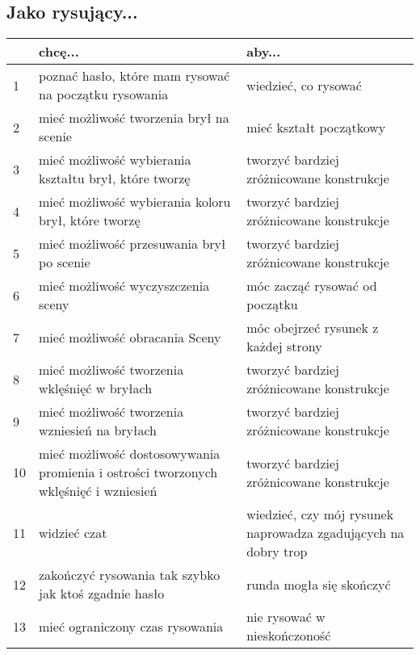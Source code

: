 \subsection{Jako rysujący...}
\begin{center}
    \begin{tabular}{ | l | p{6cm} | p{6cm} |}
    \hline
     & \textbf{chcę...} & \textbf{aby...} \\ \hline
    1 & poznać hasło, które mam rysować na początku rysowania & wiedzieć, co rysować \\ \hline
    2 & mieć możliwość tworzenia brył na scenie & mieć kształt początkowy \\ \hline
    3 & mieć możliwość wybierania kształtu brył, które tworzę & tworzyć bardziej zróżnicowane konstrukcje \\ \hline
    4 & mieć możliwość wybierania koloru brył, które tworzę & tworzyć bardziej zróżnicowane konstrukcje \\ \hline
    5 & mieć możliwość przesuwania brył po scenie & tworzyć bardziej zróżnicowane konstrukcje \\ \hline
    6 & mieć możliwość wyczyszczenia sceny & móc zacząć rysować od początku \\ \hline
    7 & mieć możliwość obracania Sceny & móc obejrzeć rysunek z każdej strony \\ \hline
    8 & mieć możliwość tworzenia wklęśnięć w bryłach & tworzyć bardziej zróżnicowane konstrukcje \\ \hline
    9 & mieć możliwość tworzenia wzniesień na bryłach & tworzyć bardziej zróżnicowane konstrukcje \\ \hline
    10 & mieć możliwość dostosowywania promienia i ostrości tworzonych wklęśnięć i wzniesień & tworzyć bardziej zróżnicowane konstrukcje \\ \hline
    11 & widzieć czat & wiedzieć, czy mój rysunek naprowadza zgadujących na dobry trop \\ \hline
    12 & zakończyć rysowania tak szybko jak ktoś zgadnie hasło & runda mogła się skończyć \\ \hline
    13 & mieć ograniczony czas rysowania & nie rysować w nieskończoność \\ \hline
    \end{tabular}
\end{center}

